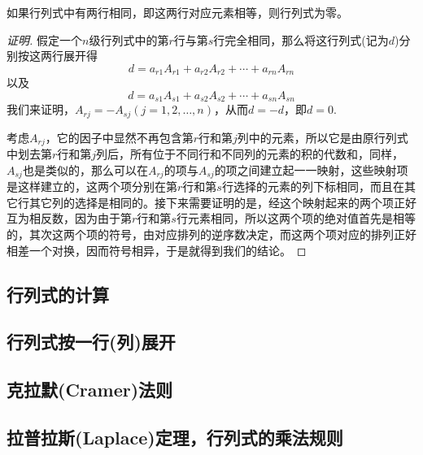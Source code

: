 \begin{property}
    如果行列式中有两行相同，即这两行对应元素相等，则行列式为零。
\end{property}

\begin{proof}[证明]
  假定一个$n$级行列式中的第$r$行与第$s$行完全相同，那么将这行列式(记为$d$)分别按这两行展开得
  \[ d = a_{r1}A_{r1}+a_{r2}A_{r2}+\cdots+a_{rn}A_{rn} \]
  以及
  \[ d = a_{s1}A_{s1}+a_{s2}A_{s2}+\cdots+a_{sn}A_{sn} \]
  我们来证明，$A_{rj}=-A_{sj}(j=1,2,\ldots,n)$，从而$d=-d$，即$d=0$.

  考虑$A_{rj}$，它的因子中显然不再包含第$r$行和第$j$列中的元素，所以它是由原行列式中划去第$r$行和第$j$列后，所有位于不同行和不同列的元素的积的代数和，同样，$A_{sj}$也是类似的，那么可以在$A_{rj}$的项与$A_{sj}$的项之间建立起一一映射，这些映射项是这样建立的，这两个项分别在第$r$行和第$s$行选择的元素的列下标相同，而且在其它行其它列的选择是相同的。接下来需要证明的是，经这个映射起来的两个项正好互为相反数，因为由于第$r$行和第$s$行元素相同，所以这两个项的绝对值首先是相等的，其次这两个项的符号，由对应排列的逆序数决定，而这两个项对应的排列正好相差一个对换，因而符号相异，于是就得到我们的结论。
\end{proof}

\subsection{行列式的计算}
\label{sec:computition-of-determinant}

\subsection{行列式按一行(列)展开}
\label{sec:determinant-expand-by-row-or-colume}

\subsection{克拉默(Cramer)法则}
\label{sec:cramer-rule}

\subsection{拉普拉斯(Laplace)定理，行列式的乘法规则}
\label{sec:laplace-theorem-of-determinant}




